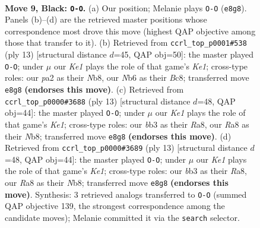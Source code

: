 \documentclass[11pt]{article}
\begin{document}
\clearpage

\begin{figure}[p]\centering
\begin{subfigure}{0.46\textwidth}\centering
\resizebox{\linewidth}{!}{%
\newchessgame
\chessboard[
  setfen={rnbqk2r/pp3pbp/1n1pp1p1/8/3P4/1B3N2/PPP2PPP/RNBQR1K1 b kq - 1 9},
  showmover=false,
  pgfstyle=straightmove, color=movearrow, markmove={e8-g8}
]}
\caption{}
\end{subfigure}\hfill
\begin{subfigure}{0.46\textwidth}\centering
\resizebox{\linewidth}{!}{%
\newchessgame
\chessboard[
  setfen={rnbqk2r/ppp1ppbp/5np1/8/2BP4/2N2N2/PPP2PPP/R1BQ1RK1 b kq - 3 7},
  showmover=false,
  pgfstyle=straightmove, color=movearrow, markmove={e8-g8}
]}
\caption{}
\end{subfigure}
\\[4pt]
\begin{subfigure}{0.46\textwidth}\centering
\resizebox{\linewidth}{!}{%
\newchessgame
\chessboard[
  setfen={rnbqk2r/ppp1ppbp/5np1/8/N2P1B2/5N2/PP2PPPP/R2QKB1R b KQkq - 3 7},
  showmover=false,
  pgfstyle=straightmove, color=movearrow, markmove={e8-g8}
]}
\caption{}
\end{subfigure}\hfill
\begin{subfigure}{0.46\textwidth}\centering
\resizebox{\linewidth}{!}{%
\newchessgame
\chessboard[
  setfen={rnbqk2r/ppp1ppbp/5np1/8/N2P1B2/5N2/PP2PPPP/R2QKB1R b KQkq - 3 7},
  showmover=false,
  pgfstyle=straightmove, color=movearrow, markmove={e8-g8}
]}
\caption{}
\end{subfigure}
\caption{\textbf{Move 9, Black: \texttt{O-O}.} (a) Our position; Melanie plays \texttt{O-O} (\texttt{e8g8}). Panels (b)--(d) are the retrieved master positions whose correspondence most drove this move (highest QAP objective among those that transfer to it). (b) Retrieved from \texttt{ccrl\_top\_p0001\#538} (ply 13) [structural distance $d$=45, QAP obj=50]: the master played \texttt{O-O}; under $\mu$ our \emph{Ke1} plays the role of that game's \emph{Ke1}; cross-type roles: our \emph{p}a2 as their \emph{N}b8, our \emph{N}b6 as their \emph{B}c8; transferred move \texttt{e8g8} \textbf{(endorses this move)}. (c) Retrieved from \texttt{ccrl\_top\_p0000\#3688} (ply 13) [structural distance $d$=48, QAP obj=44]: the master played \texttt{O-O}; under $\mu$ our \emph{Ke1} plays the role of that game's \emph{Ke1}; cross-type roles: our \emph{b}b3 as their \emph{R}a8, our \emph{R}a8 as their \emph{N}b8; transferred move \texttt{e8g8} \textbf{(endorses this move)}. (d) Retrieved from \texttt{ccrl\_top\_p0000\#3689} (ply 13) [structural distance $d$=48, QAP obj=44]: the master played \texttt{O-O}; under $\mu$ our \emph{Ke1} plays the role of that game's \emph{Ke1}; cross-type roles: our \emph{b}b3 as their \emph{R}a8, our \emph{R}a8 as their \emph{N}b8; transferred move \texttt{e8g8} \textbf{(endorses this move)}. Synthesis: 3 retrieved analogs transferred to \texttt{O-O} (summed QAP objective 139, the strongest correspondence among the candidate moves); Melanie committed it via the \texttt{search} selector.}
\label{fig:thought-m17}
\end{figure}
\end{document}

